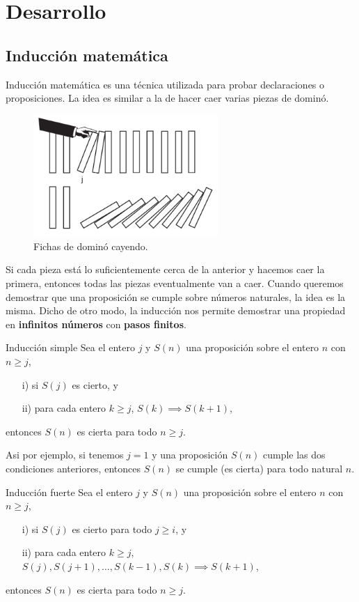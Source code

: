 \section{Desarrollo}

\subsection{Inducción matemática}

Inducción matemática es una técnica utilizada para probar declaraciones o proposiciones.
La idea es similar a la de hacer caer varias piezas de dominó.
\begin{figure}[htb]
    \centering
    \includegraphics[width=7cm]{images/dominoes-fall}
    \caption{Fichas de dominó cayendo.}
    \label{fig:figure}
\end{figure}
Si cada pieza está lo suficientemente cerca de la anterior y hacemos caer la primera, entonces todas las piezas eventualmente van a caer.
Cuando queremos demostrar que una proposición se cumple sobre números naturales, la idea es la misma.
Dicho de otro modo, la inducción nos permite demostrar una propiedad en \textbf{infinitos números} con \textbf{pasos finitos}.

\begin{principle.box}{Inducción simple}{}
    Sea el entero $j$ y $S(n)$ una proposición sobre el entero $n$ con $n \geq j$,
    \begin{itemize}
        \item[i)] si $S(j)$ es cierto, y
        \item[ii)] para cada entero $k \geq j$, $S(k) \implies S(k + 1)$,
    \end{itemize}
    entonces $S(n)$ es cierta para todo $n \geq j$.
\end{principle.box}

Asi por ejemplo, si tenemos $j = 1$ y una proposición $S(n)$ cumple las dos condiciones anteriores, entonces $S(n)$
se cumple (es cierta) para todo natural $n$.


\begin{principle.box}{Inducción fuerte}{}
    Sea el entero $j$ y $S(n)$ una proposición sobre el entero $n$ con $n \geq j$,
    \begin{itemize}
        \item[i)] si $S(j)$ es cierto para todo $j \geq i$, y
        \item[ii)] para cada entero $k \geq j$, $S(j), S(j+1), \ldots, S(k - 1), S(k) \implies S(k + 1)$,
    \end{itemize}
    entonces $S(n)$ es cierta para todo $n \geq j$.
\end{principle.box}



